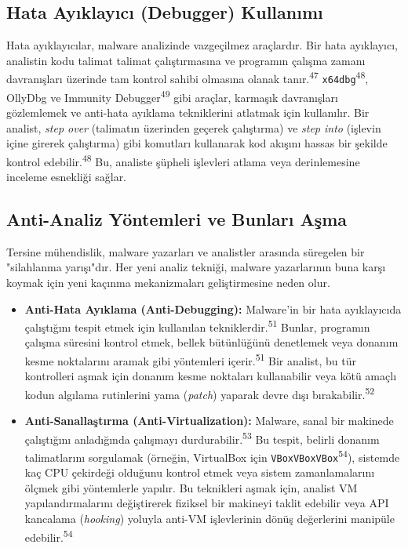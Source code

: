 \subsection{Hata Ayıklayıcı (Debugger) Kullanımı}

Hata ayıklayıcılar, malware analizinde vazgeçilmez araçlardır. Bir hata ayıklayıcı, analistin kodu talimat talimat çalıştırmasına ve programın çalışma zamanı davranışları üzerinde tam kontrol sahibi olmasına olanak tanır.\textsuperscript{47} \texttt{x64dbg}\textsuperscript{48}, OllyDbg ve Immunity Debugger\textsuperscript{49} gibi araçlar, karmaşık davranışları gözlemlemek ve anti-hata ayıklama tekniklerini atlatmak için kullanılır. Bir analist, \textit{step over} (talimatın üzerinden geçerek çalıştırma) ve \textit{step into} (işlevin içine girerek çalıştırma) gibi komutları kullanarak kod akışını hassas bir şekilde kontrol edebilir.\textsuperscript{48} Bu, analiste şüpheli işlevleri atlama veya derinlemesine inceleme esnekliği sağlar.

\subsection{Anti-Analiz Yöntemleri ve Bunları Aşma}

Tersine mühendislik, malware yazarları ve analistler arasında süregelen bir "silahlanma yarışı"dır. Her yeni analiz tekniği, malware yazarlarının buna karşı koymak için yeni kaçınma mekanizmaları geliştirmesine neden olur.

\begin{itemize}
    \item \textbf{Anti-Hata Ayıklama (Anti-Debugging):} Malware'in bir hata ayıklayıcıda çalıştığını tespit etmek için kullanılan tekniklerdir.\textsuperscript{51} Bunlar, programın çalışma süresini kontrol etmek, bellek bütünlüğünü denetlemek veya donanım kesme noktalarını aramak gibi yöntemleri içerir.\textsuperscript{51} Bir analist, bu tür kontrolleri aşmak için donanım kesme noktaları kullanabilir veya kötü amaçlı kodun algılama rutinlerini yama (\textit{patch}) yaparak devre dışı bırakabilir.\textsuperscript{52}
    \item \textbf{Anti-Sanallaştırma (Anti-Virtualization):} Malware, sanal bir makinede çalıştığını anladığında çalışmayı durdurabilir.\textsuperscript{53} Bu tespit, belirli donanım talimatlarını sorgulamak (örneğin, VirtualBox için \texttt{VBoxVBoxVBox}\textsuperscript{54}), sistemde kaç CPU çekirdeği olduğunu kontrol etmek veya sistem zamanlamalarını ölçmek gibi yöntemlerle yapılır. Bu teknikleri aşmak için, analist VM yapılandırmalarını değiştirerek fiziksel bir makineyi taklit edebilir veya API kancalama (\textit{hooking}) yoluyla anti-VM işlevlerinin dönüş değerlerini manipüle edebilir.\textsuperscript{54}
\end{itemize}

